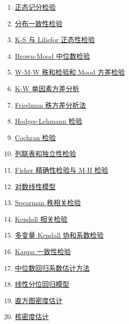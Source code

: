 \documentclass[11pt]{article}
\begin{document}
\begin{multicols}{2}
\begin{enumerate}
		\item \href{https://mp.weixin.qq.com/s/QoBHfUtLXswmpv045i7Wtg}{正态记分检验}	%
		\item \href{https://mp.weixin.qq.com/s/XWgQZz1mlLqMs1pgQFIiFw}{分布一致性检验}	%
		\item \href{https://mp.weixin.qq.com/s/Ak5Q4W1WrTgeGQuRAS9b3A}{K-S 与 Liliefor 正态性检验}	%
		\item \href{https://mp.weixin.qq.com/s/ukDR91C9737TCJbOWK0C5g}{Brown-Mood 中位数检验}	%
		\item \href{https://mp.weixin.qq.com/s/N_KEMx-2gq1PWim8ip_qBA}{W-M-W 秩和检验和 Mood 方差检验}	%
		\item \href{https://mp.weixin.qq.com/s/ukZMYfHzG1-LfjT8Q7aeaw}{K-W 单因素方差分析}	%
		\item \href{https://mp.weixin.qq.com/s/KMAgnOXFFI72byPVliA1ow}{Friedman 秩方差分析法}	%
		\item \href{https://mp.weixin.qq.com/s/2biRultEkp1x36yEWL-mzQ}{Hodges-Lehmann 检验}	%
		\item \href{https://mp.weixin.qq.com/s/ST1M1dhP8eOxX0ZMqawwKw}{Cochran 检验}	%
		\item \href{https://mp.weixin.qq.com/s/9U1wJznMwuKfRmAN2VgitQ}{列联表和独立性检验}	%
		\item \href{https://mp.weixin.qq.com/s/VaGwaiCgoRa5gtSkLBONuQ}{Fisher 精确性检验与 M-H 检验}	%
		\item \href{https://mp.weixin.qq.com/s/1G4Gbhn4izk15k7SuVufFw}{对数线性模型}	%
		\item \href{https://mp.weixin.qq.com/s/YoL1lFbCtD0XDwmhtFbdrA}{Spearman 秩相关检验}	%
		\item \href{https://mp.weixin.qq.com/s/5qqlaLtjsaoTYjqgPKugNg}{Kendall 相关检验}	%
		\item \href{https://mp.weixin.qq.com/s/m5gcPNTEATxcw3S--7QAVw}{多变量 Kendall 协和系数检验}	%
		\item \href{https://mp.weixin.qq.com/s/QpWBn7htcLom6vJ52kOHAA}{Kappa 一致性检验}	%
		\item \href{https://mp.weixin.qq.com/s/8A4Kk0gqBkSvzQUKGcNCHQ}{中位数回归系数估计方法}	%
		\item \href{https://mp.weixin.qq.com/s/OASb4wPvb7KrfFMuDLdbnQ}{线性分位回归模型}	%
		\item \href{https://mp.weixin.qq.com/s/a52nR5oArB6NKUsSJnV6Hw}{直方图密度估计}	%
		\item \href{https://mp.weixin.qq.com/s/Mwigbuo4rFgon_GrV66i5w}{核密度估计}	%

\end{enumerate}
\end{multicols}
\end{document}

